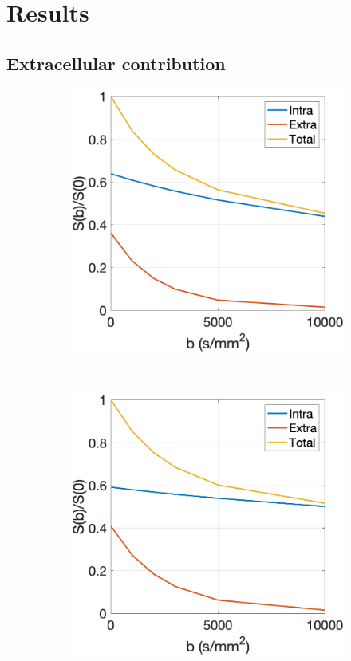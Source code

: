 \section{Results}
\label{sec:frf_results}

\subsection{Extracellular contribution}
\label{sec:frf_res_extracellular}

\begin{figure}
  \centering
  \begin{subfigure}[]{0.4\textwidth}
    \includegraphics[width=\textwidth]{figures/frf_experiment/in_ex_tot_Kappa_2.png}
    \caption{}
  \end{subfigure}
  ~
  \begin{subfigure}[]{0.4\textwidth}
    \includegraphics[width=\textwidth]{figures/frf_experiment/in_ex_tot_Kappa_6.png}

\end{subfigure}
\end{figure}
